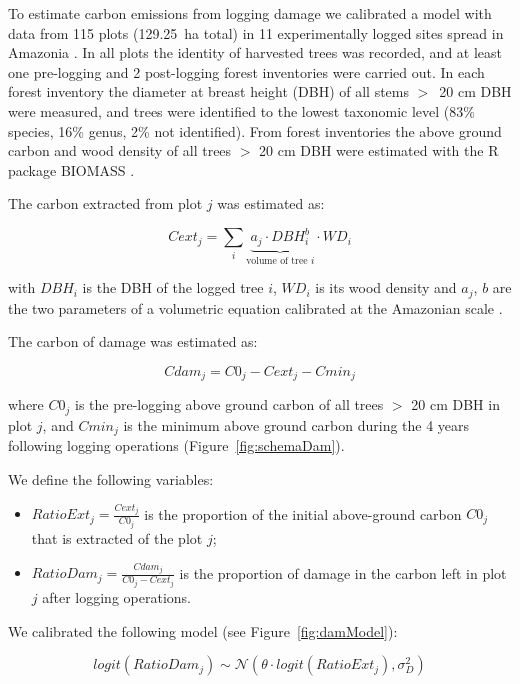 \documentclass{article}
\begin{document}
To estimate carbon emissions from logging damage we calibrated a model with data from 115 plots (129.25~ha total) in 11 experimentally logged sites spread in Amazonia \cite{Sist2015}. In all plots the identity of harvested trees was recorded, and at least one pre-logging and 2 post-logging forest inventories were carried out. In each forest inventory the diameter at breast height (DBH) of all stems $>$~20 cm DBH were measured, and trees were identified to the lowest taxonomic level (83\% species, 16\% genus, 2\% not identified). 
From forest inventories the above ground carbon and wood density of all trees $>$ 20 cm DBH  were estimated with the R package BIOMASS \cite{Rejou-Mechain2017}. 

The carbon extracted from plot $j$ was estimated as: 

\begin{equation}
    Cext_j = \sum_{i} \underbrace{a_j \cdot DBH_i^b}_{\text{volume of tree $i$}} \cdot WD_i
\end{equation}

with $DBH_i$ is the DBH of the logged tree $i$, $WD_i$ is its wood density and $a_j$, $b$ are the two parameters of a volumetric equation calibrated at the Amazonian scale \cite{Piponiot2019}. 

The carbon of damage was estimated as: 

\begin{equation}
    Cdam_j = C0_j - Cext_j - Cmin_j
\end{equation}

where $C0_j$ is the pre-logging above ground carbon of all trees $>$ 20 cm DBH in plot $j$, and $Cmin_j$ is the minimum above ground carbon during the 4 years following logging operations (Figure~\ref{fig:schemaDam}). 

We define the following variables: 

\begin{itemize}
    \item $RatioExt_j=\frac{Cext_j}{C0_j}$ is the proportion of the initial above-ground carbon $C0_j$ that is extracted of the plot $j$; 
    \item $RatioDam_j = \frac{Cdam_j}{C0_j-Cext_j}$ is the proportion of damage in the carbon left in plot $j$ after logging operations. 
\end{itemize}

We calibrated the following model (see Figure~\ref{fig:damModel}): 

\begin{equation}
logit(RatioDam_j) \sim \mathcal{N}(\theta \cdot logit(RatioExt_j), \sigma_D^2)
\end{equation} 
\end{document}

